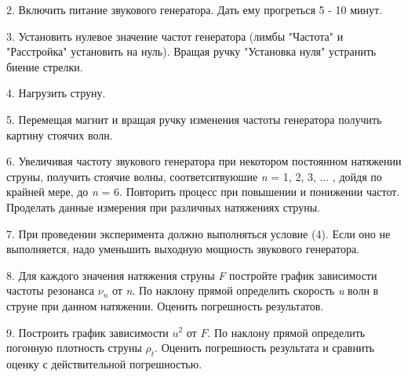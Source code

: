\documentclass[12pt,a4paper]{article}
\begin{document}
2. Включить питание звукового генератора. Дать ему прогреться 5 - 10 минут.

3. Установить нулевое значение частот генератора (лимбы "Частота" и "Расстройка" установить на нуль). Вращая ручку "Установка нуля" устранить биение стрелки.

4. Нагрузить струну.

5. Перемещая магнит и вращая ручку изменения частоты генератора получить картину стоячих волн.

6. Увеличивая частоту звукового генератора при некотором постоянном натяжении струны, получить стоячие волны, соответсвтвуюшие \textit{n} = 1, 2, 3, ... , дойдя по крайней мере, до \textit{n} = 6. Повторить процесс при повышении и понижении частот. Проделать данные измерения при различных натяжениях струны.

7. При проведении эксперимента должно выполняться условие (4). Если оно не выполняется, надо уменьшить выходную мощность звукового генератора.

8. Для каждого значения натяжения струны \textit{F} постройте график зависимости частоты резонанса $\nu_n$ от \textit{n}. По наклону прямой определить скорость \textit{u} волн в струне при данном натяжении. Оценить погрешность результатов.

9. Построить график зависимости $u^2$ от $F$. По наклону прямой определить погонную плотность струны $\rho_t$. Оценить погрешность результата и сравнить оценку с действительной погрешностью.
\end{document}
